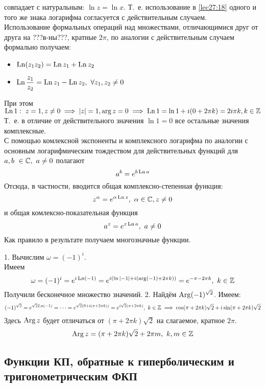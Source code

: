 \documentclass[../../main.tex]{subfiles}
\begin{document}
совпадает с натуральным: $ \ln z = \ln x $. Т.~е. использование в 
\eqref{lec27:18} одного и того же знака логарифма согласуется с действительным
случаем. \\
Использование формальных операций над множествами, отличающимися друг от друга
на ???в-ны???, кратные $ 2\pi $, по аналогии с действительным случаем 
формально
получаем:\\
\begin{itemize}
	\item $\operatorname{Ln}(z_1z_2) = \operatorname{Ln} z_1 + \operatorname{Ln} z_2$
	\item $\operatorname{Ln} \dfrac{z_1}{z_2} = \operatorname{Ln} z_1 - \operatorname{Ln} z_2,\ \forall z_1, z_2 \neq 0$
\end{itemize}
При этом $ \operatorname{Ln} 1:\ z = 1, z \neq 0 \implies |z| = 1, \arg z = 0 \implies 
\operatorname{Ln} 1 = \ln 1 + i(0 + 2\pi k) = 2i\pi k, 
k\in\mathbb{Z}
$
Т.~е. в отличие от действительного значения $ \ln 1 = 0 $ все остальные 
значения комплексные.\\
С помощью комлексной экспоненты и комплексного логарифма по аналогии с 
основным
логарифмическим тождеством для действительных функций для 
$ a, b\ \in \mathbb{C},\ a \neq 0 $ полагают 
\begin{equation}
\label{lec27:20}
a^b = e^{b \operatorname{Ln} a}
\end{equation}
Отсюда, в частности, вводится общая комплексно-степенная функция:
\begin{equation}
\label{lec27:21}
z^\alpha = e ^{\alpha \operatorname{Ln} z},\ \alpha \in \mathbb{C}, z \neq 0
\end{equation}
и общая комлексно-показательная функция 
\begin{equation}
\label{lec27:22}
a^z = e^{z \operatorname{Ln} a},\ a \neq 0
\end{equation}
Как правило в результате получаем многозначные функции.
\begin{exmps}
1. Вычислим $ \omega = (-1)^i $.\\
Имеем \[
\omega = (-1)^i = e^{i \operatorname{Ln}(-1)} = 
e^{i(\ln |-1| + i(\arg(-1) + 2\pi k))} = 
e^{-\pi - 2\pi k},\ k \in \mathbb{Z}
\]
Получили бесконечное множество значений.
2. Найдём $ \operatorname{Arg}(-1)^{\sqrt{2}} $. Имеем: \[
(-1)^{\sqrt{2}} = e^{\sqrt{2} Ln(-1)} = \dots =
e^{\sqrt{2}(0 + i(\pi + 2\pi k))} = 
e^{i\sqrt{2}(\pi + 2\pi k)},\ k \in \mathbb{Z} \implies
\cos (\pi + 2\pi k)\sqrt{2} + i\sin(\pi + 2\pi k)\sqrt{2}
\]
Здесь $ \operatorname{Arg} z $ будет отличаться от $ (\pi + 2\pi k)\sqrt{2} $ на слагаемое, 
кратное $ 2\pi $.
\[
\Arg z = (\pi + 2\pi k)\sqrt{2} + 2\pi m,\ k, m \in \Z
\]
\end{exmps}

\subsection{Функции КП, обратные к гиперболическим и тригонометрическим ФКП}
\end{document}
